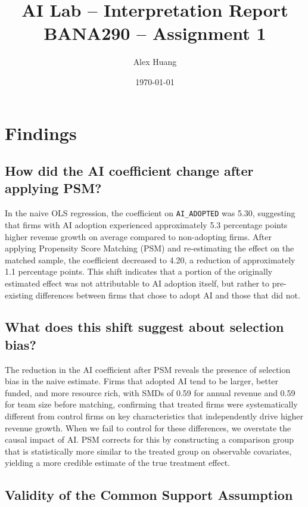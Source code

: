 \documentclass[12pt]{article}
\title{AI Lab -- Interpretation Report\\
\large BANA290 -- Assignment 1}
\author{Alex Huang}
\date{\today}
\begin{document}
\maketitle

\section*{Findings}

\subsection*{How did the AI coefficient change after applying PSM?}

In the naive OLS regression, the coefficient on \texttt{AI\_ADOPTED} was 5.30, suggesting that firms with AI adoption experienced approximately 5.3 percentage points higher revenue growth on average compared to non-adopting firms. After applying Propensity Score Matching (PSM) and re-estimating the effect on the matched sample, the coefficient decreased to 4.20, a reduction of approximately 1.1 percentage points. This shift indicates that a portion of the originally estimated effect was not attributable to AI adoption itself, but rather to pre-existing differences between firms that chose to adopt AI and those that did not.

\subsection*{What does this shift suggest about selection bias?}

The reduction in the AI coefficient after PSM reveals the presence of selection bias in the naive estimate. Firms that adopted AI tend to be larger, better funded, and more resource rich, with SMDs of 0.59 for annual revenue and 0.59 for team size before matching, confirming that treated firms were systematically different from control firms on key characteristics that independently drive higher revenue growth. When we fail to control for these differences, we overstate the causal impact of AI. PSM corrects for this by constructing a comparison group that is statistically more similar to the treated group on observable covariates, yielding a more credible estimate of the true treatment effect.

\subsection*{Validity of the Common Support Assumption}
\end{document}
